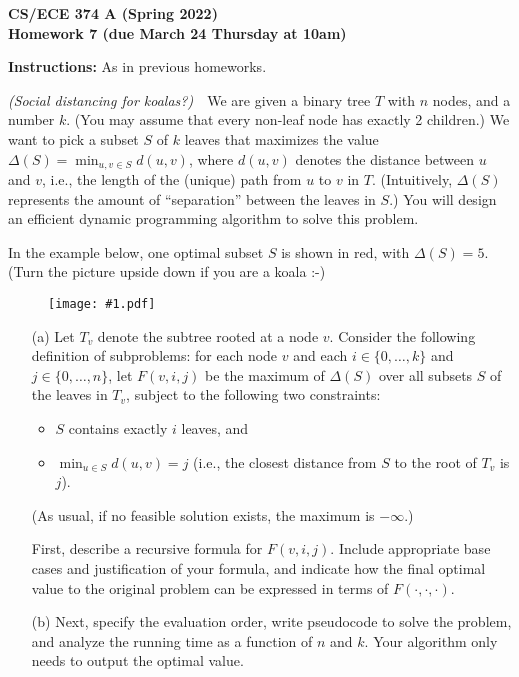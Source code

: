 \documentclass[11pt]{article}
\newcommand{\fig}[2]{\begin{figure}[h]\begin{center}%
  \texttt{[image: \#1.pdf]}\end{center}%
  \end{figure}}
\begin{document}
\begin{center}\Large\bf 
CS/ECE 374 A (Spring 2022)\\
{\Large Homework 7} (due March 24 Thursday at 10am)
\end{center}

\medskip
\noindent
{\bf Instructions:} As in previous homeworks.  


\begin{description}
\bigskip
\item[Problem 7.1:] 
\emph{(Social distancing for koalas?)}\ \ 
We are given a binary tree $T$ with $n$ nodes, and a number $k$.  (You may assume that every non-leaf node has exactly 2 children.)
We want to pick a subset $S$ of $k$ leaves that maximizes the
value $\Delta(S)=\min_{u,v\in S} d(u,v)$, where $d(u,v)$ denotes the
distance between $u$ and $v$, i.e., the length of the 
(unique) path from $u$ to $v$ in $T$.  (Intuitively, $\Delta(S)$ represents
the amount of ``separation'' between the leaves in $S$.)
You will design an efficient dynamic programming algorithm to solve this problem.

In the example below, one optimal subset $S$ is shown in red, with $\Delta(S)=5$.  (Turn the picture upside down if you are a koala :-) 

\fig{hw7fig1}{0.8}

\vspace{-2ex}
\begin{enumerate}
\item[(a)] Let $T_v$ denote the subtree rooted at a node $v$.
Consider the following definition of subproblems: for each node $v$ and each $i\in\{0,\ldots,k\}$ and $j\in\{0,\ldots,n\}$, let
$F(v,i,j)$ be the maximum of $\Delta(S)$ over all subsets $S$ of the leaves in $T_v$, subject to
the following two constraints: 
\begin{itemize}
\item $S$ contains exactly $i$ leaves, and 
\item $\min_{u\in S} d(u,v) = j$
(i.e., the closest distance from $S$ to the root of $T_v$ is $j$).
\end{itemize}
(As usual, if no feasible solution exists, the maximum is $-\infty$.)

First, describe a recursive formula for $F(v,i,j)$.
Include appropriate base cases and justification of your formula, and indicate how the final optimal value to the original problem can be expressed in terms of $F(\cdot,\cdot,\cdot)$.

\smallskip
\item[(b)]
Next, specify the evaluation order, write pseudocode to solve the problem, and analyze the running time as a function of $n$ and $k$.
Your algorithm only needs to output the optimal value.
\end{enumerate}




\end{description}
\end{document}
